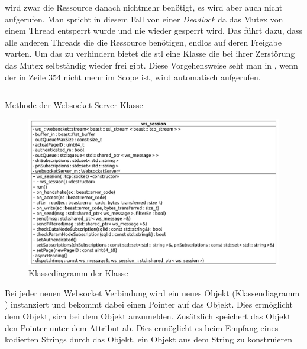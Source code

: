 wird zwar die Ressource danach nichtmehr benötigt, es wird aber auch nicht  aufgerufen.
Man spricht in diesem Fall von einer \emph{Deadlock} da das Mutex von einem Thread entsperrt wurde und nie wieder gesperrt wird. 
Das führt dazu, dass alle anderen Threads die die Ressource benötigen, endlos auf deren Freigabe warten. 
Um das zu verhindern bietet die \ac{stl} eine  Klasse die bei ihrer Zerstörung das Mutex selbständig wieder frei gibt.
Diese Vorgehensweise seht man in , wenn der  in Zeile 354 nicht mehr im Scope ist, wird automatisch  aufgerufen.
\begin{listing}[ht]
  \inputminted[linenos=true,breaklines=true, firstline=348, lastline=354]{c++}{../Backend/WebsocketServer.cpp}
  \caption{Methode  der Websocket Server Klasse}
  \label{list:addSession}
\end{listing}
\begin{figure}[ht]
  \centering
  \includegraphics[width=\textwidth]{content/hauptteil/umsetzungPoC/backend/uml/classesOfOverview/ws_session.pdf}
  \caption{Klassediagramm der Klasse }
  \label{fig:backend:classDiag:wsSession}
\end{figure}
Bei jeder neuen Websocket Verbindung wird ein neues  Objekt (Klassendiagramm ) instanziert 
und bekommt dabei einen Pointer auf das  Objekt. Dies ermöglicht dem  Objekt, 
sich bei dem  Objekt anzumelden. 
Zusätzlich speichert das  Objekt den Pointer unter dem Attribut  ab.
Dies ermöglicht es beim Empfang eines kodierten Strings durch das  Objekt, ein  Objekt aus dem String zu konstruieren
